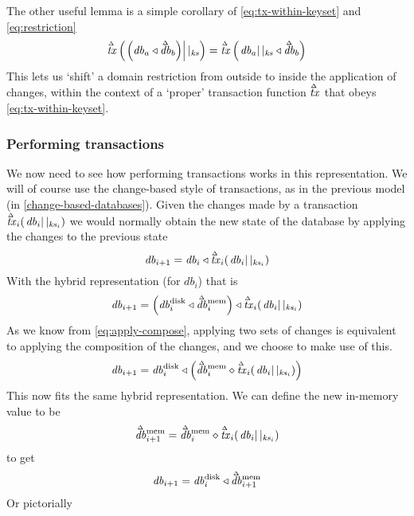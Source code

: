 \documentclass[11pt,a4paper]{article}
\newcommand\restrict[2]{\left.#1\right||_{#2}}
\newcommand\deltavar[1]{\accentset{\Delta}{#1}}
\begin{document}
The other useful lemma is a simple corollary of \cref{eq:tx-within-keyset} and
\cref{eq:restriction}
\begin{equation}
\label{eq:restriction_corollary}
  \deltavar{\mathit{tx}}\left(\restrict{\left(\mathit{db}_a \triangleleft \deltavar{\mathit{db}}_b\right)}{\mathit{ks}}\right)
=
  \deltavar{\mathit{tx}}\left(\restrict{\mathit{db}_a}{\mathit{ks}} \triangleleft \deltavar{\mathit{db}}_b\right)
\end{equation}
This lets us `shift' a domain restriction from outside to inside the application
of changes, within the context of a `proper' transaction function
$\deltavar{\mathit{tx}}$ that obeys \cref{eq:tx-within-keyset}.

\subsubsection{Performing transactions}
\label{performing-transactions}
We now need to see how performing transactions works in this representation. We
will of course use the change-based style of transactions, as in the previous
model (in \cref{change-based-databases}). Given the changes
made by a transaction $\deltavar{\mathit{tx}}_i(\restrict{\mathit{db}_i}{\mathit{ks}_i})$
we would normally obtain the new state of the database by applying the changes
to the previous state
\[
\mathit{db}_{i+1} = \mathit{db}_i \triangleleft \deltavar{\mathit{tx}}_i(\restrict{\mathit{db}_i}{\mathit{ks}_i})
\]
With the hybrid representation (for $\mathit{db}_i$) that is
\[
\mathit{db}_{i+1} = \left( \mathit{db}^{\mathrm{disk}}_i \triangleleft \deltavar{\mathit{db}}^{\mathrm{mem}}_i \right)
      \triangleleft \deltavar{\mathit{tx}}_i(\restrict{\mathit{db}_i}{\mathit{ks}_i})
\]
As we know from \cref{eq:apply-compose}, applying two sets of changes is
equivalent to applying the composition of the changes, and we choose to make
use of this.
\[
\mathit{db}_{i+1} = \mathit{db}^{\mathrm{disk}}_i
      \triangleleft \left( \deltavar{\mathit{db}}^{\mathrm{mem}}_i
                  \diamond \deltavar{\mathit{tx}}_i(\restrict{\mathit{db}_i}{\mathit{ks}_i})
                    \right)
\]
This now fits the same hybrid representation. We can define the new in-memory
value to be
\[
\deltavar{\mathit{db}}^{\mathrm{mem}}_{i+1} = \deltavar{\mathit{db}}^{\mathrm{mem}}_i
                  \diamond \deltavar{\mathit{tx}}_i(\restrict{\mathit{db}_i}{\mathit{ks}_i})
\]
to get
\[
\mathit{db}_{i+1} = \mathit{db}^{\mathrm{disk}}_i
      \triangleleft \deltavar{\mathit{db}}^{\mathrm{mem}}_{i+1}
\]
Or pictorially
\end{document}
